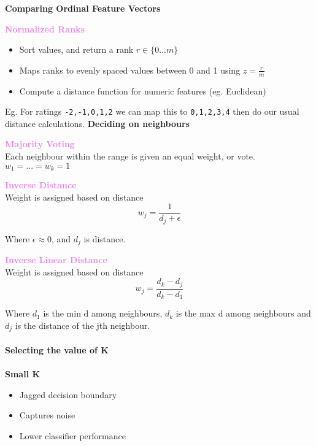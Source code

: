 \documentclass[a4paper,10pt]{article}
\begin{document}
\noindent \textcolor{Periwinkle}{\textbf{Comparing Ordinal Feature Vectors}}
\begin{shaded}
	\noindent \textcolor{Violet}{\textbf{Normalized Ranks}}
	\begin{itemize}
		\item Sort values, and return a rank $r \in \{0...m\}$
		\item Maps ranks to evenly spaced values between 0 and 1 using $z = 
		\frac{r}{m}$
		\item Compute a distance function for numeric features (eg. Euclidean)
	\end{itemize}
\end{shaded}
Eg. For ratings \texttt{-2,-1,0,1,2} we can map this to \texttt{0,1,2,3,4} then do our usual distance calculations.
\newpage
\noindent \textcolor{Periwinkle}{\textbf{Deciding on neighbours}}
\begin{shaded}
	\noindent \textcolor{Violet}{\textbf{Majority Voting}}\\
	Each neighbour within the range is given an equal weight, or vote. $w_{1} =... = w_{k} = 1$
\end{shaded}
\begin{shaded}
	\noindent \textcolor{Violet}{\textbf{Inverse Distance}}\\
	Weight is assigned based on distance 
	\begin{equation*}
		w_{j} = \frac{1}{d_{j} + \epsilon}
	\end{equation*}
\end{shaded}
\noindent Where $\epsilon \approx 0$, and $d_{j}$ is distance. 
\begin{shaded}
	\noindent \textcolor{Violet}{\textbf{Inverse Linear Distance}}\\
	Weight is assigned based on distance 
	\begin{equation*}
		w_{j} = \frac{d_{k} - d_{j}}{d_{k} - d_{1}}
	\end{equation*}
\end{shaded}
\noindent Where $d_{1}$ is the min d among neighbours, $d_{k}$ is the max d among neighbours and $d_{j}$ is the distance of the jth neighbour. \\\\
\textcolor{Periwinkle}{\textbf{Selecting the value of K}}\\\\
\textbf{Small K}
\begin{itemize}
	\item Jagged decision boundary 
	\item Captures noise 
	\item Lower classifier performance 
\end{itemize}
\end{document}

